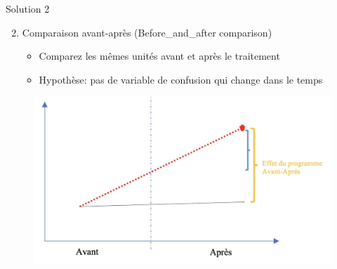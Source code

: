 \documentclass[ignorenonframetext,]{beamer}
\providecommand{\tightlist}{%
  \setlength{\itemsep}{0pt}\setlength{\parskip}{0pt}}
\begin{document}
\begin{frame}{Solution 2}
\protect\hypertarget{solution-2}{}

\begin{enumerate}
\setcounter{enumi}{1}
\tightlist
\item
  Comparaison avant-après (Before\_and\_after comparison)

  \begin{itemize}
  \tightlist
  \item
    Comparez les mêmes unités avant et après le traitement
  \item
    Hypothèse: pas de variable de confusion qui change dans le temps
  \end{itemize}
\end{enumerate}

\begin{figure}
\includegraphics[width=0.8\linewidth]{Before-After} \end{figure}

\end{frame}
\end{document}
